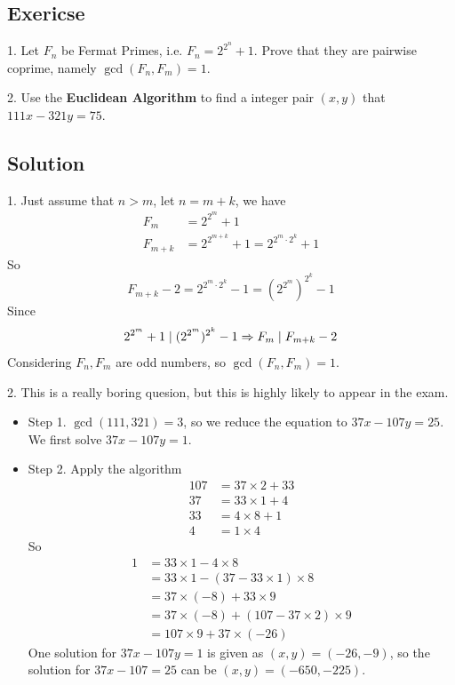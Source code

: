 \documentclass[12pt]{article}
\begin{document}
	\subsection{Exericse}
	1. Let $F_n$ be Fermat Primes, i.e. $F_n=2^{2^n} +1$. Prove that they are 
    pairwise coprime, namely $\gcd(F_n,F_m)=1.$
    \par 
    2. Use the \textbf{Euclidean Algorithm} to find a integer pair $(x,y)$ that 
    $111x-321y=75.$ 
	\subsection{Solution}
	1. Just assume that $n>m$, let $n = m+k$, we have
	\begin{equation*}
		\begin{aligned}
			F_m &= 2^{2^m}+1 \\
			F_{m+k} & = 2^{2^{m+k}}+1 = 2^{2^m \cdot 2^k}+1
		\end{aligned}
	\end{equation*}
	So 
	$$
		F_{m+k}-2 = 2^{2^m \cdot 2^k} -1 = (2^{2^m})^{2^k}-1
	$$
	Since 
	$$
		2^{2^m} + 1 \mid (2^{2^m}) ^ {2^k} -1 \Rightarrow F_m \mid F_{m+k} -2
	$$
	Considering $F_n,F_m$ are odd numbers, so $\gcd(F_n,F_m)=1$.
	\par 
	2. This is a really boring quesion, but this is highly likely to appear
	in the exam.
	\begin{itemize}
		\item Step 1. $\gcd(111,321) = 3$, so we reduce the equation to $37 x - 107 y = 25$. We first 
		solve $37x-107y=1$.
		\item Step 2. Apply the algorithm 
			\begin{equation*}
				\begin{aligned}
					107 &= 37 \times 2 + 33 \\
					37  &= 33 \times 1 + 4  \\
					33  &= 4  \times 8 + 1  \\	
					4   &= 1  \times 4
				\end{aligned}
			\end{equation*}
			So 
			\begin{equation*}
				\begin{aligned}
					1 &= 33 \times 1 - 4 \times 8 \\ 
					  &= 33 \times 1 - (37 - 33 \times 1) \times 8 \\
					  &= 37 \times (-8) + 33 \times 9 \\
					  &= 37 \times (-8) + (107-37 \times 2) \times 9 \\
					  &= 107 \times 9 + 37 \times (-26)
				\end{aligned}
			\end{equation*}
			One solution for $37x-107y=1$ is given as $(x,y)=(-26,-9)$, 
			so the solution for $37x-107=25$ can be $(x,y) = (-650,-225)$.
	\end{itemize}
\end{document}
